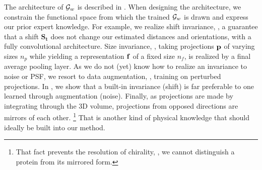 The architecture of $\mathcal{G}_w$ is described in .
When designing the architecture, we constrain the functional space from which the trained $\mathcal{G}_w$ is drawn and express our prior expert knowledge.
For example, we realize shift invariance, \ie, a guarantee that a shift $\mathbf{S_t}$ does not change our estimated distances and orientations, with a fully convolutional architecture.
Size invariance, \ie, taking projections $\mathbf{p}$ of varying sizes $n_p$ while yielding a representation $\mathbf{f}$ of a fixed size $n_f$, is realized by a final average pooling layer.
As we do not (yet) know how to realize an invariance to noise or PSF, we resort to data augmentation, \ie, training on perturbed projections.
In , we show that a built-in invariance (shift) is far preferable to one learned through augmentation (noise).
Finally, as projections are made by integrating through the 3D volume, projections from opposed directions are mirrors of each other.%
\footnote{That fact prevents the resolution of chirality, \ie, we cannot distinguish a protein from its mirrored form.}
That is another kind of physical knowledge that should ideally be built into our method.

